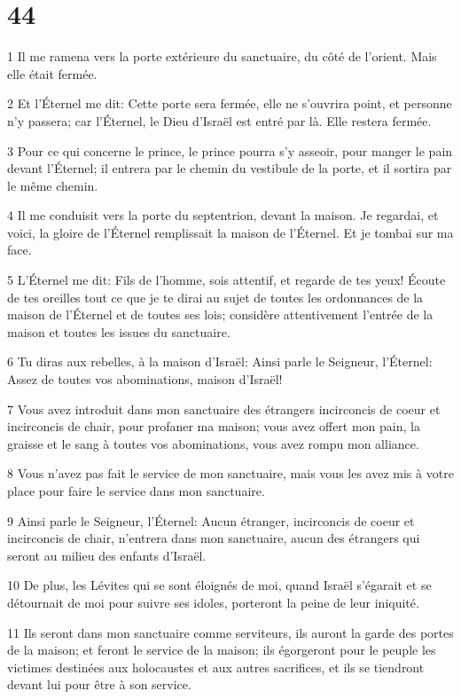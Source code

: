 \chapter{44}

\par 1 Il me ramena vers la porte extérieure du sanctuaire, du côté de l'orient. Mais elle était fermée.
\par 2 Et l'Éternel me dit: Cette porte sera fermée, elle ne s'ouvrira point, et personne n'y passera; car l'Éternel, le Dieu d'Israël est entré par là. Elle restera fermée.
\par 3 Pour ce qui concerne le prince, le prince pourra s'y asseoir, pour manger le pain devant l'Éternel; il entrera par le chemin du vestibule de la porte, et il sortira par le même chemin.
\par 4 Il me conduisit vers la porte du septentrion, devant la maison. Je regardai, et voici, la gloire de l'Éternel remplissait la maison de l'Éternel. Et je tombai sur ma face.
\par 5 L'Éternel me dit: Fils de l'homme, sois attentif, et regarde de tes yeux! Écoute de tes oreilles tout ce que je te dirai au sujet de toutes les ordonnances de la maison de l'Éternel et de toutes ses lois; considère attentivement l'entrée de la maison et toutes les issues du sanctuaire.
\par 6 Tu diras aux rebelles, à la maison d'Israël: Ainsi parle le Seigneur, l'Éternel: Assez de toutes vos abominations, maison d'Israël!
\par 7 Vous avez introduit dans mon sanctuaire des étrangers incirconcis de coeur et incirconcis de chair, pour profaner ma maison; vous avez offert mon pain, la graisse et le sang à toutes vos abominations, vous avez rompu mon alliance.
\par 8 Vous n'avez pas fait le service de mon sanctuaire, mais vous les avez mis à votre place pour faire le service dans mon sanctuaire.
\par 9 Ainsi parle le Seigneur, l'Éternel: Aucun étranger, incirconcis de coeur et incirconcis de chair, n'entrera dans mon sanctuaire, aucun des étrangers qui seront au milieu des enfants d'Israël.
\par 10 De plus, les Lévites qui se sont éloignés de moi, quand Israël s'égarait et se détournait de moi pour suivre ses idoles, porteront la peine de leur iniquité.
\par 11 Ils seront dans mon sanctuaire comme serviteurs, ils auront la garde des portes de la maison; et feront le service de la maison; ils égorgeront pour le peuple les victimes destinées aux holocaustes et aux autres sacrifices, et ils se tiendront devant lui pour être à son service.
